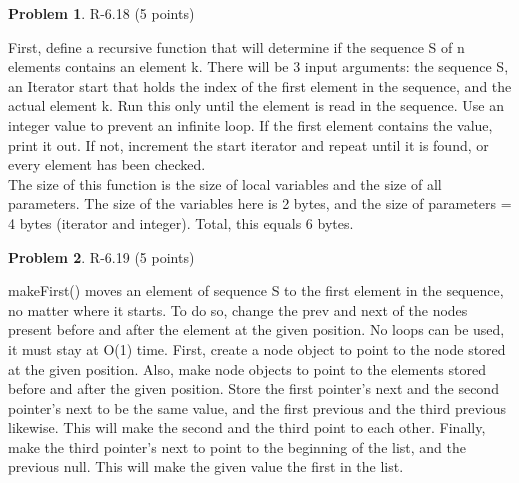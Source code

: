 \documentclass[12pt]{report}
\theoremstyle{definition}
\newtheorem{problem}{Problem}
\begin{document}
\begin{problem}			R-6.18 (5 points)
\end{problem}
					First, define a recursive function that will determine if the sequence S of n elements 						contains an element k. There will be 3 input arguments: the sequence S, an Iterator 						start that holds the index of the first element in the sequence, and the actual element k. 					Run this only until the element is read in the sequence. Use an integer value to prevent 					an infinite loop. If the first element contains the value, print it out. If not, increment the 					start iterator and repeat until it is found, or every element has been checked. \\
					The size of this function is the size of local variables and the size of all parameters. The 					size of the variables here is 2 bytes, and the size of parameters = 4 bytes (iterator and 					integer). Total, this equals 6 bytes.
					
\begin{problem}			R-6.19 (5 points)
\end{problem}
					makeFirst() moves an element of sequence S to the first element in the sequence, no 					matter where it starts. To do so, change the prev and next of the nodes present before 					and after the element at the given position. No loops can be used, it must stay at O(1) 					time. First, create a node object to point to the node stored at the given position. Also, 					make node objects to point to the elements stored before and after the given position. 					Store the first pointer's next and the second pointer's next to be the same value, and 					the first previous and the third previous likewise. This will make the second and the 						third point to each other. Finally, make the third pointer's next to point to the beginning 					of the list, and the previous null. This will make the given value the first in the list.
					
\end{document}
